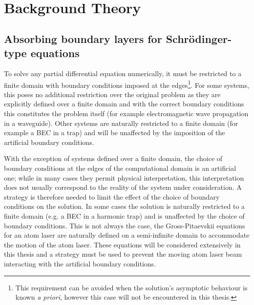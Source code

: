 \chapter{Background Theory}
\label{BackgroundTheory}
\graphicspath{{Figures/BackgroundTheory/}{Figures/Common/}}

\section{Absorbing boundary layers for Schrödinger-type equations}
\label{BackgroundTheory:AbsorbingBoundaryLayers}


To solve any partial differential equation numerically, it must be restricted to a finite domain with boundary conditions imposed at the edges\footnote{This requirement can be avoided when the solution's asymptotic behaviour is known \emph{a priori}, however this case will not be encountered in this thesis.}. For some systems, this poses no additional restriction over the original problem as they are explicitly defined over a finite domain and with the correct boundary conditions this constitutes the problem itself (for example electromagnetic wave propagation in a waveguide). Other systems are naturally restricted to a finite domain (for example a BEC in a trap) and will be unaffected by the imposition of the artificial boundary conditions. 

With the exception of systems defined over a finite domain, the choice of boundary conditions at the edges of the computational domain is an artificial one; while in many cases they permit physical interpretation, this interpretation does not usually correspond to the reality of the system under consideration. A strategy is therefore needed to limit the effect of the choice of boundary conditions on the solution.  In some cases the solution is naturally restricted to a finite domain (e.g. a BEC in a harmonic trap) and is unaffected by the choice of boundary conditions.  This is not always the case, the Gross-Pitaevskii equations for an atom laser are naturally defined on a semi-infinite domain to accommodate the motion of the atom laser. These equations will be considered extensively in this thesis and a strategy must be used to prevent the moving atom laser beam interacting with the artificial boundary conditions.

